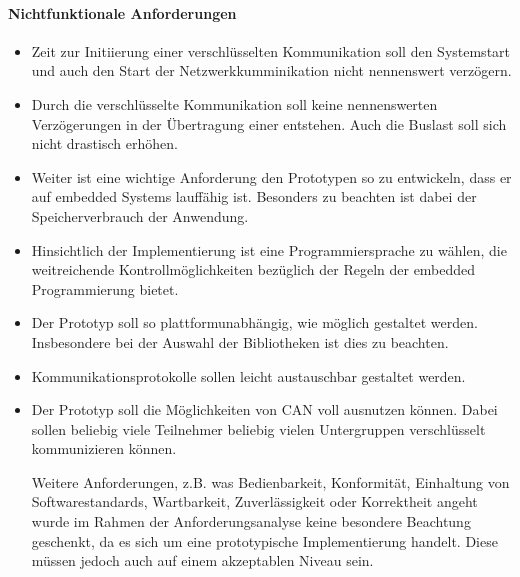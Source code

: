 \paragraph{Nichtfunktionale Anforderungen}
\begin{itemize}
	

\item Zeit zur Initiierung einer verschlüsselten Kommunikation soll den Systemstart und auch den Start der Netzwerkkumminikation nicht nennenswert verzögern.

\item Durch die verschlüsselte Kommunikation soll keine nennenswerten Verzögerungen in der Übertragung einer entstehen. Auch die Buslast soll sich nicht drastisch erhöhen.

\item Weiter ist eine wichtige Anforderung den Prototypen so zu entwickeln, dass er auf embedded Systems lauffähig ist. Besonders zu beachten ist dabei der Speicherverbrauch der Anwendung. 

\item Hinsichtlich der Implementierung ist eine Programmiersprache zu wählen, die weitreichende Kontrollmöglichkeiten bezüglich der Regeln der embedded Programmierung bietet.

\item Der Prototyp soll so plattformunabhängig, wie möglich gestaltet werden. Insbesondere bei der Auswahl der Bibliotheken ist dies zu beachten.

\item Kommunikationsprotokolle sollen leicht austauschbar gestaltet werden. 

\item Der Prototyp soll die Möglichkeiten von CAN voll ausnutzen können. Dabei sollen beliebig viele Teilnehmer beliebig vielen Untergruppen verschlüsselt kommunizieren können.

Weitere Anforderungen, z.B. was Bedienbarkeit, Konformität, Einhaltung von Softwarestandards, Wartbarkeit, Zuverlässigkeit oder Korrektheit angeht wurde im Rahmen der Anforderungsanalyse keine besondere Beachtung geschenkt, da es sich um eine prototypische Implementierung handelt. Diese müssen jedoch auch auf einem akzeptablen Niveau sein.

\end{itemize}



